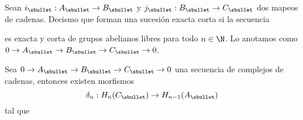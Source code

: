\documentclass{article}
\begin{document}
\begin{dfn}
    Sean $i_{\sbullet}:A_{\sbullet}\to B_{\sbullet}$ y $j_{\sbullet}:B_{\sbullet}\to C_{\sbullet}$
    dos mapeos de cadenas. Decismo que forman una sucesión exacta corta si la secuencia

    \vspace{2mm}
    \centerline{
    }
    \vspace{2mm}
    \noindent es exacta y corta de grupos abelianos libres para todo $n\in\N$. Lo anotamos como
    $0\to A_{\sbullet}\to B_{\sbullet}\to C_{\sbullet}\to0$.
\end{dfn}

\begin{teo}
    Sea $0\to A_{\sbullet}\to B_{\sbullet}\to C_{\sbullet}\to0$ una secuencia de complejos de 
    cadenas, entonces existen morfismos
    \begin{equation*}
        \delta_{n}:H_{n}(C_{\sbullet})\to H_{n-1}(A_{\sbullet})
    \end{equation*}
    tal que
    
    \vspace{2mm}
    \centerline{
    }
\end{teo}
\end{document}
